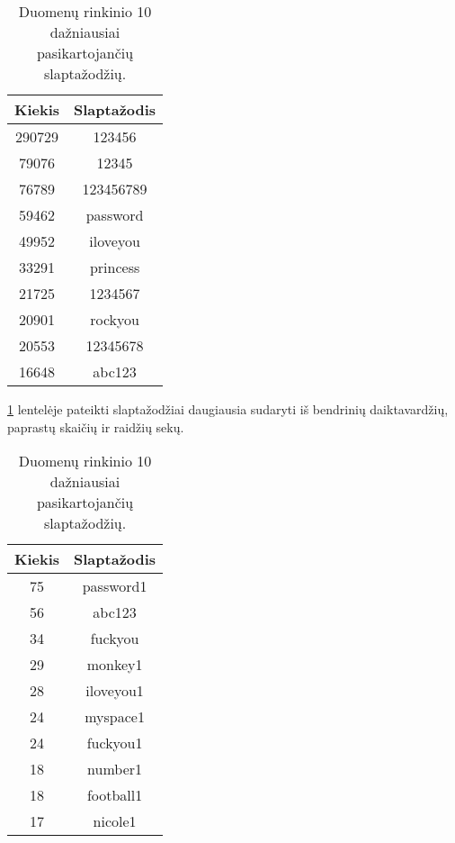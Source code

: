 \documentclass{VUMIFInfBakalaurinis}
\begin{document}
\begin{table}[hb]
  \centering
  \caption{
    Duomenų rinkinio  10 dažniausiai pasikartojančių 
    slaptažodžių.
  }
  \begin{tabular}{|c|c|}
    \hline \textbf{Kiekis} & \textbf{Slaptažodis} \\
    \hline 290729 & 123456 \\
    \hline 79076 & 12345 \\
    \hline 76789 & 123456789 \\
    \hline 59462 & password \\
    \hline 49952 & iloveyou \\
    \hline 33291 & princess \\
    \hline 21725 & 1234567 \\
    \hline 20901 & rockyou \\
    \hline 20553 & 12345678 \\
    \hline 16648 & abc123 \\
    \hline
  \end{tabular}
  \label{tab:rockyou10}
\end{table}

\ref{tab:rockyou10} lentelėje pateikti slaptažodžiai daugiausia sudaryti iš 
bendrinių daiktavardžių, paprastų skaičių ir raidžių sekų.

\begin{table}[ht]
  \centering
  \caption{
    Duomenų rinkinio  10 dažniausiai pasikartojančių 
    slaptažodžių.
  }
  \begin{tabular}{|c|c|}
    \hline \textbf{Kiekis} & \textbf{Slaptažodis} \\
    \hline 75 & password1 \\
    \hline 56 & abc123 \\
    \hline 34 & fuckyou \\
    \hline 29 & monkey1 \\
    \hline 28 & iloveyou1 \\
    \hline 24 & myspace1 \\
    \hline 24 & fuckyou1 \\
    \hline 18 & number1 \\
    \hline 18 & football1 \\
    \hline 17 & nicole1 \\
    \hline
  \end{tabular}
  \label{tab:linkedin10}
\end{table}
\end{document}
